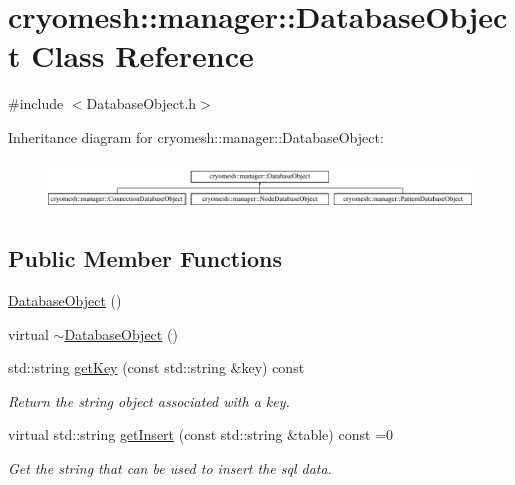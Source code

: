\hypertarget{classcryomesh_1_1manager_1_1DatabaseObject}{\section{cryomesh\-:\-:manager\-:\-:\-Database\-Object \-Class \-Reference}
\label{classcryomesh_1_1manager_1_1DatabaseObject}
}


{\ttfamily \#include $<$\-Database\-Object.\-h$>$}

\-Inheritance diagram for cryomesh\-:\-:manager\-:\-:\-Database\-Object\-:\begin{figure}[H]
\begin{center}
\leavevmode
\includegraphics[height=1.287356cm]{classcryomesh_1_1manager_1_1DatabaseObject}
\end{center}
\end{figure}
\subsection*{\-Public \-Member \-Functions}
\begin{DoxyCompactItemize}
\item 
\hyperlink{classcryomesh_1_1manager_1_1DatabaseObject_a4806f6b018d86828c4251e06ac2634d9}{\-Database\-Object} ()
\item 
virtual \hyperlink{classcryomesh_1_1manager_1_1DatabaseObject_a462e3eeb0610dc1e7e47661b86c862f6}{$\sim$\-Database\-Object} ()
\item 
std\-::string \hyperlink{classcryomesh_1_1manager_1_1DatabaseObject_a66ded4e1a1bccd65c94922648c7135c5}{get\-Key} (const std\-::string \&key) const 
\begin{DoxyCompactList}\small\item\em \-Return the string object associated with a key. \end{DoxyCompactList}\item 
virtual std\-::string \hyperlink{classcryomesh_1_1manager_1_1DatabaseObject_ad55c6e711341a652790b97f549b0dc63}{get\-Insert} (const std\-::string \&table) const =0
\begin{DoxyCompactList}\small\item\em \-Get the string that can be used to insert the sql data. \end{DoxyCompactList}\end{DoxyCompactItemize}
